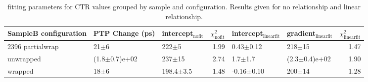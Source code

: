 \begin{table}
\caption{\label{tab:ctrfit-20-results} fitting parameters for CTR values grouped by sample and configuration. Results given for no relationship and linear relationship.}
\begin{tabular}{lllrllr}
\hline
SampleB configuration & PTP Change (ps) & intercept$_\text{nofit}$ &  $\chi^2_\text{nofit}$ & intercept$_\text{linearfit}$ & gradient$_\text{linearfit}$ &  $\chi^2_\text{linearfit}$ \\
\hline
2396    partialwrap   &           21$\pm$6 &       222$\pm$5 &                   1.99 &       0.43$\pm$0.12 &         218$\pm$15 &                    1.47 \\
        unwrapped     &  (1.8$\pm$0.7)e+02 &      237$\pm$15 &                   2.74 &         1.7$\pm$1.7 &  (2.3$\pm$0.4)e+02 &                    1.90 \\
        wrapped       &           18$\pm$6 &   198.4$\pm$3.5 &                   1.48 &      -0.16$\pm$0.10 &         200$\pm$14 &                    1.28 \\
\hline
\end{tabular}
\end{table}